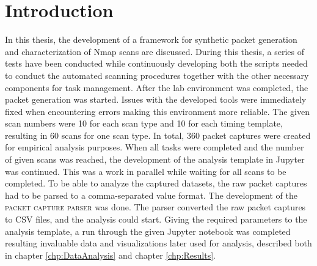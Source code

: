 \section{Introduction}
\label{s:ConclusionIntroduction}
In this thesis, the development of a framework for synthetic packet generation and characterization of Nmap scans are discussed.
During this thesis, a series of tests have been conducted while continuously developing both the scripts needed to conduct the automated scanning procedures together with the other necessary components for task management.
After the lab environment was completed, the packet generation was started. Issues with the developed tools were immediately fixed when encountering errors making this environment more reliable.
The given scan numbers were 10 for each scan type and 10 for each timing template, resulting in 60 scans for one scan type. In total, 360 packet captures were created for empirical analysis purposes.
When all tasks were completed and the number of given scans was reached, the development of the analysis template in Jupyter was continued. This was a work in parallel while waiting for all scans to be completed.
To be able to analyze the captured datasets, the raw packet captures had to be parsed to a comma-separated value format.
The development of the \textsc{packet capture parser} was done. The parser converted the raw packet captures to CSV files, and the analysis could start.
Giving the required parameters to the analysis template, a run through the given Jupyter notebook was completed resulting invaluable data and visualizations later used for analysis, described both in chapter \ref{chp:DataAnalysis} and chapter \ref{chp:Results}.




